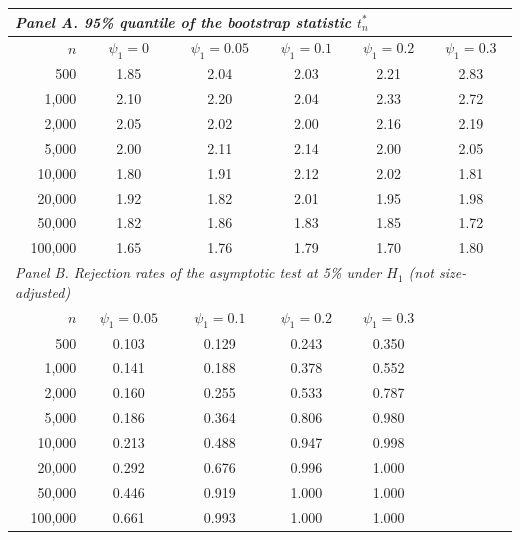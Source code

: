 \begin{tabular}{rccccc}
\toprule
\multicolumn{6}{l}{\textit{Panel A. 95\% quantile of the bootstrap statistic $t_n^{*}$}} \\
\midrule
$n$ & $\psi_1=0$ & $\psi_1=0.05$ & $\psi_1=0.1$ & $\psi_1=0.2$ & $\psi_1=0.3$ \\
\midrule
500 & 1.85 & 2.04 & 2.03 & 2.21 & 2.83 \\
1{,}000 & 2.10 & 2.20 & 2.04 & 2.33 & 2.72 \\
2{,}000 & 2.05 & 2.02 & 2.00 & 2.16 & 2.19 \\
5{,}000 & 2.00 & 2.11 & 2.14 & 2.00 & 2.05 \\
10{,}000 & 1.80 & 1.91 & 2.12 & 2.02 & 1.81 \\
20{,}000 & 1.92 & 1.82 & 2.01 & 1.95 & 1.98 \\
50{,}000 & 1.82 & 1.86 & 1.83 & 1.85 & 1.72 \\
100{,}000 & 1.65 & 1.76 & 1.79 & 1.70 & 1.80 \\
\midrule
\multicolumn{6}{l}{\textit{Panel B. Rejection rates of the asymptotic test at 5\% under $H_1$ (not size-adjusted)}} \\
\midrule
$n$ & $\psi_1=0.05$ & $\psi_1=0.1$ & $\psi_1=0.2$ & $\psi_1=0.3$ & \\
\midrule
500 & 0.103 & 0.129 & 0.243 & 0.350 & \\
1{,}000 & 0.141 & 0.188 & 0.378 & 0.552 & \\
2{,}000 & 0.160 & 0.255 & 0.533 & 0.787 & \\
5{,}000 & 0.186 & 0.364 & 0.806 & 0.980 & \\
10{,}000 & 0.213 & 0.488 & 0.947 & 0.998 & \\
20{,}000 & 0.292 & 0.676 & 0.996 & 1.000 & \\
50{,}000 & 0.446 & 0.919 & 1.000 & 1.000 & \\
100{,}000 & 0.661 & 0.993 & 1.000 & 1.000 & \\
\bottomrule
\end{tabular}
